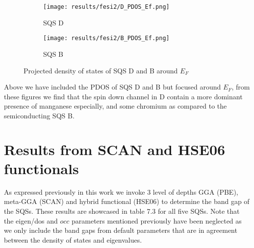   
\begin{figure}[H]
	\centering
	\begin{subfigure}{.45\textwidth}
			\texttt{[image: results/fesi2/D\_PDOS\_Ef.png]}
			\caption{SQS D}		
	\end{subfigure}
	\hspace{0.5cm}
	\begin{subfigure}{.45\textwidth}
		\texttt{[image: results/fesi2/B\_PDOS\_Ef.png]}
		\caption{SQS B}		
	\end{subfigure}
	\caption{Projected density of states of SQS D and B around $E_F$}
\end{figure}

Above we have included the PDOS of SQS D and B but focused around $E_F$, from these figures we find that the spin down channel in D contain a more dominant presence of manganese especially, and some chromium as compared to the semiconducting SQS B.  

\section{Results from SCAN and HSE06 functionals}
As expressed previously in this work we invoke 3 level of depths GGA (PBE), meta-GGA (SCAN) and hybrid functional (HSE06) to determine the band gap of the SQSs. These results are showcased in table 7.3 for all five SQSs. Note that the eigen/dos and $occ$ parameters mentioned previously have been neglected as we only include the band gaps from default parameters that are in agreement between the density of states and eigenvalues.
 
